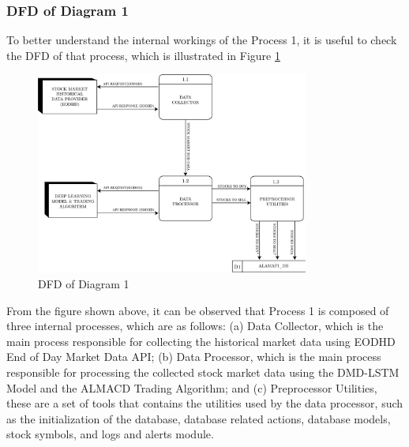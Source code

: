 \subsubsection{DFD of Diagram 1}
\label{subsubsec:dfd1}
To better understand the internal workings of the Process 1, 
it is useful to check the DFD of that process, which is illustrated in Figure \ref{fig:dfd1}
\begin{figure}[ht]
    \centering
    \includegraphics[width=0.80\textwidth]{./assets/Chapter_3/DFD/DFD_1.png}
    \caption{DFD of Diagram 1}
    \label{fig:dfd1}
\end{figure}
\FloatBarrier

From the figure shown above, it can be observed that Process 1 
is composed of three internal processes, which are as follows:
(a) Data Collector, which is the main process responsible 
for collecting the historical market data using EODHD End of Day Market Data API; 
(b) Data Processor, which is the main process responsible for processing the collected 
stock market data using the DMD-LSTM Model and the ALMACD Trading Algorithm; and
(c) Preprocessor Utilities, these are a set of tools that contains the 
utilities used by the data processor, such as the initialization of the database, database related actions, 
database models, stock symbols, and logs and alerts module.
\\


